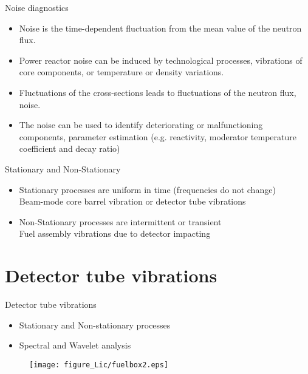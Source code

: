 \documentclass[clock,style=fyma,paper=screen,blackslide,trans=Wipe,mode=present]{powerdot}
\begin{document}
\begin{slide}{Noise diagnostics}
\begin{itemize}
\item Noise is the time-dependent fluctuation from the mean
value of the neutron flux.\\[5mm]

\item Power reactor noise can be induced by technological
processes, vibrations of core components, or
temperature or density variations.\\[5mm]

\item Fluctuations of the cross-sections leads to fluctuations of
the neutron flux, noise.\\[5mm]

\item The noise can be used to identify deteriorating or
malfunctioning components, parameter estimation (e.g. reactivity,
moderator temperature coefficient and decay ratio)\\[5mm]
\end{itemize}
\end{slide}


\begin{slide}{Stationary and Non-Stationary}
\begin{itemize}
\item Stationary processes are uniform in time (frequencies do not
change)
\\ Beam-mode core barrel vibration or detector tube vibrations\\
[3mm]

\item Non-Stationary processes are intermittent or transient
\\ Fuel assembly vibrations due to detector impacting
\end{itemize}
\vspace{-5mm}
\begin{figure}[ht]
\end{figure}
\end{slide}

\section[slide=false]{Detector tube vibrations}
\begin{slide}{Detector tube vibrations}
\begin{itemize}
\item Stationary and Non-stationary processes

\item Spectral and Wavelet analysis
\end{itemize}
\begin{figure}[H]
\centering
\texttt{[image: figure\_Lic/fuelbox2.eps]}
\end{figure}

\end{slide}
\end{document}
